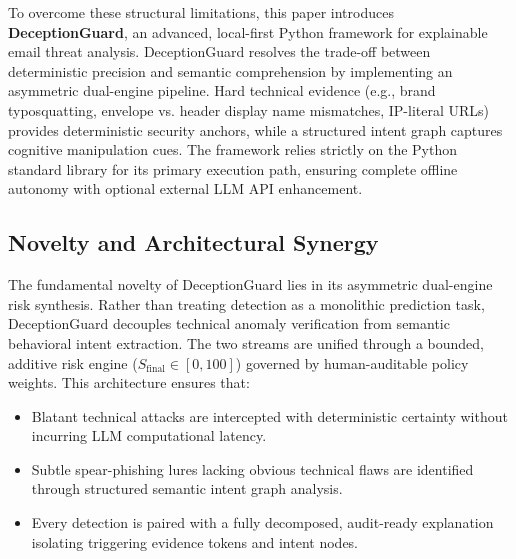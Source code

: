 \documentclass{ieeeaccess}
\begin{document}
To overcome these structural limitations, this paper introduces \textbf{DeceptionGuard}, an advanced, local-first Python framework for explainable email threat analysis. DeceptionGuard resolves the trade-off between deterministic precision and semantic comprehension by implementing an asymmetric dual-engine pipeline. Hard technical evidence (e.g., brand typosquatting, envelope vs. header display name mismatches, IP-literal URLs) provides deterministic security anchors, while a structured intent graph captures cognitive manipulation cues. The framework relies strictly on the Python standard library for its primary execution path, ensuring complete offline autonomy with optional external LLM API enhancement.

\subsection{Novelty and Architectural Synergy}
The fundamental novelty of DeceptionGuard lies in its asymmetric dual-engine risk synthesis. Rather than treating detection as a monolithic prediction task, DeceptionGuard decouples technical anomaly verification from semantic behavioral intent extraction. The two streams are unified through a bounded, additive risk engine ($S_{\text{final}} \in [0, 100]$) governed by human-auditable policy weights. This architecture ensures that:
\begin{itemize}
    \item Blatant technical attacks are intercepted with deterministic certainty without incurring LLM computational latency.
    \item Subtle spear-phishing lures lacking obvious technical flaws are identified through structured semantic intent graph analysis.
    \item Every detection is paired with a fully decomposed, audit-ready explanation isolating triggering evidence tokens and intent nodes.
\end{itemize}
\end{document}
